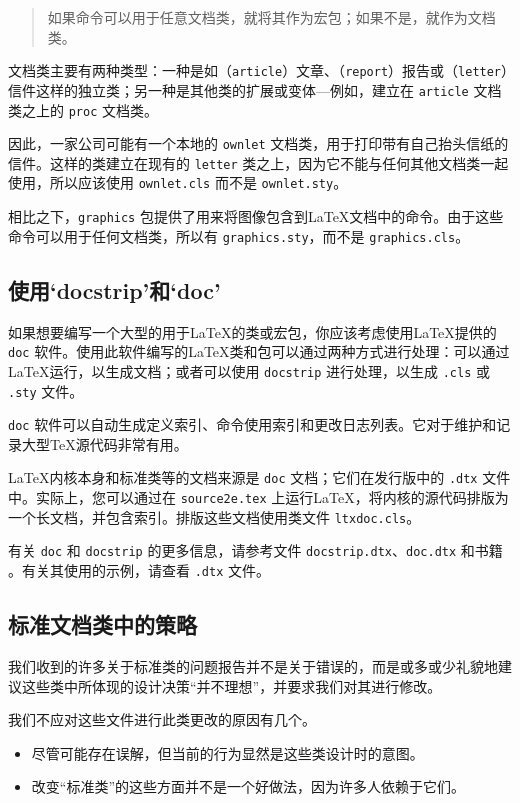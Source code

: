 \documentclass[12pt]{ltxguide}
\begin{document}
\begin{quote}
  如果命令可以用于任意文档类，就将其作为宏包；如果不是，就作为文档类。
\end{quote}

文档类主要有两种类型：一种是如（\verb|article|）文章、（\verb|report|）报告或（\verb|letter|）信件这样的独立类；另一种是其他类的扩展或变体---例如，建立在 \verb|article| 文档类之上的 \verb|proc| 文档类。

因此，一家公司可能有一个本地的 \verb|ownlet| 文档类，用于打印带有自己抬头信纸的信件。这样的类建立在现有的 \verb|letter| 类之上，因为它不能与任何其他文档类一起使用，所以应该使用 \verb|ownlet.cls| 而不是 \verb|ownlet.sty|。

相比之下，\verb|graphics| 包提供了用来将图像包含到\LaTeX{}文档中的命令。由于这些命令可以用于任何文档类，所以有 \verb|graphics.sty|，而不是 \verb|graphics.cls|。
%
\subsection{使用`docstrip'和`doc'}
如果想要编写一个大型的用于\LaTeX{}的类或宏包，你应该考虑使用\LaTeX{}提供的 \verb|doc| 软件。使用此软件编写的\LaTeX{}类和包可以通过两种方式进行处理：可以通过\LaTeX{}运行，以生成文档；或者可以使用 \verb|docstrip| 进行处理，以生成 \verb|.cls| 或 \verb|.sty| 文件。

\verb|doc| 软件可以自动生成定义索引、命令使用索引和更改日志列表。它对于维护和记录大型\TeX{}源代码非常有用。

\LaTeX{}内核本身和标准类等的文档来源是 \verb|doc| 文档；它们在发行版中的 \verb|.dtx| 文件中。实际上，您可以通过在 \verb|source2e.tex| 上运行\LaTeX{}，将内核的源代码排版为一个长文档，并包含索引。排版这些文档使用类文件 \verb|ltxdoc.cls|。

有关 \verb|doc| 和 \verb|docstrip| 的更多信息，请参考文件 \verb|docstrip.dtx|、\verb|doc.dtx| 和书籍 \emph{\LaTeXcomp}。有关其使用的示例，请查看 \verb|.dtx| 文件。

\subsection{标准文档类中的策略}
我们收到的许多关于标准类的问题报告并不是关于错误的，而是或多或少礼貌地建议这些类中所体现的设计决策“并不理想”，并要求我们对其进行修改。

我们不应对这些文件进行此类更改的原因有几个。

\begin{itemize}
  \item 尽管可能存在误解，但当前的行为显然是这些类设计时的意图。
  \item 改变“标准类”的这些方面并不是一个好做法，因为许多人依赖于它们。
\end{itemize}
\end{document}
